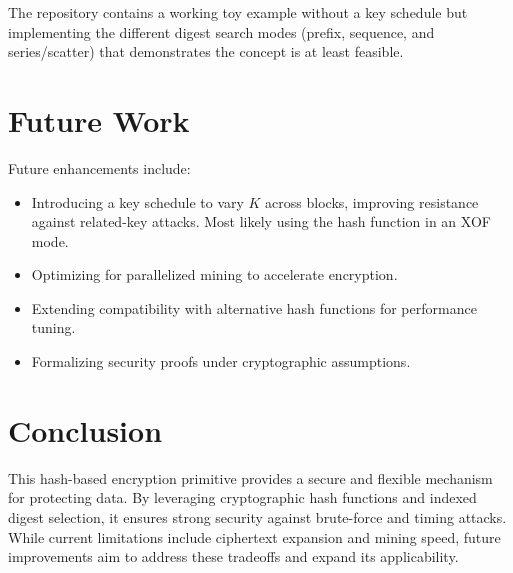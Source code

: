 \documentclass[11pt,a4paper]{article}
\begin{document}
The repository contains a working toy example without a key schedule but implementing the different digest search modes (prefix, sequence, and series/scatter) that demonstrates the concept is at least feasible.  

\section*{Future Work}

Future enhancements include:
\begin{itemize}
  \item Introducing a key schedule to vary \( K \) across blocks, improving resistance against related-key attacks. Most likely using the hash function in an XOF mode.
  \item Optimizing for parallelized mining to accelerate encryption.
  \item Extending compatibility with alternative hash functions for performance tuning.
  \item Formalizing security proofs under cryptographic assumptions.
\end{itemize}

\section*{Conclusion}

This hash-based encryption primitive provides a secure and flexible mechanism for protecting data. By leveraging cryptographic hash functions and indexed digest selection, it ensures strong security against brute-force and timing attacks. While current limitations include ciphertext expansion and mining speed, future improvements aim to address these tradeoffs and expand its applicability.
\end{document}
